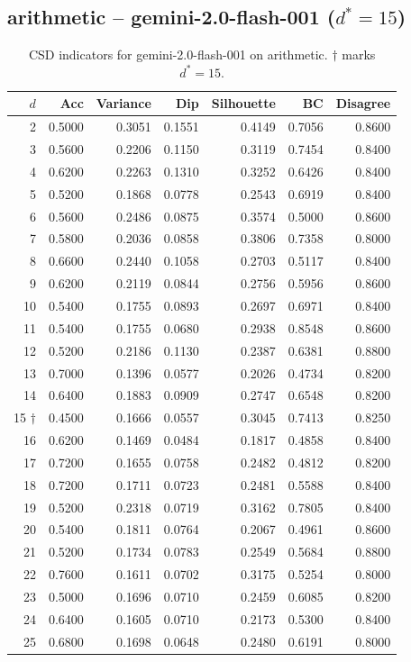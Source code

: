 \documentclass[11pt]{article}
\begin{document}
\subsection{arithmetic -- gemini-2.0-flash-001 ($d^*=15$)}

\begin{table}[h]\centering\small
\begin{tabular}{r|r|r|r|r|r|r}
\toprule
$d$ & Acc & Variance & Dip & Silhouette & BC & Disagree \\
\midrule
2 & 0.5000 & 0.3051 & 0.1551 & 0.4149 & 0.7056 & 0.8600 \\
3 & 0.5600 & 0.2206 & 0.1150 & 0.3119 & 0.7454 & 0.8400 \\
4 & 0.6200 & 0.2263 & 0.1310 & 0.3252 & 0.6426 & 0.8400 \\
5 & 0.5200 & 0.1868 & 0.0778 & 0.2543 & 0.6919 & 0.8400 \\
6 & 0.5600 & 0.2486 & 0.0875 & 0.3574 & 0.5000 & 0.8600 \\
7 & 0.5800 & 0.2036 & 0.0858 & 0.3806 & 0.7358 & 0.8000 \\
8 & 0.6600 & 0.2440 & 0.1058 & 0.2703 & 0.5117 & 0.8400 \\
9 & 0.6200 & 0.2119 & 0.0844 & 0.2756 & 0.5956 & 0.8600 \\
10 & 0.5400 & 0.1755 & 0.0893 & 0.2697 & 0.6971 & 0.8400 \\
11 & 0.5400 & 0.1755 & 0.0680 & 0.2938 & 0.8548 & 0.8600 \\
12 & 0.5200 & 0.2186 & 0.1130 & 0.2387 & 0.6381 & 0.8800 \\
13 & 0.7000 & 0.1396 & 0.0577 & 0.2026 & 0.4734 & 0.8200 \\
14 & 0.6400 & 0.1883 & 0.0909 & 0.2747 & 0.6548 & 0.8200 \\
15 $\dagger$ & 0.4500 & 0.1666 & 0.0557 & 0.3045 & 0.7413 & 0.8250 \\
16 & 0.6200 & 0.1469 & 0.0484 & 0.1817 & 0.4858 & 0.8400 \\
17 & 0.7200 & 0.1655 & 0.0758 & 0.2482 & 0.4812 & 0.8200 \\
18 & 0.7200 & 0.1711 & 0.0723 & 0.2481 & 0.5588 & 0.8400 \\
19 & 0.5200 & 0.2318 & 0.0719 & 0.3162 & 0.7805 & 0.8400 \\
20 & 0.5400 & 0.1811 & 0.0764 & 0.2067 & 0.4961 & 0.8600 \\
21 & 0.5200 & 0.1734 & 0.0783 & 0.2549 & 0.5684 & 0.8800 \\
22 & 0.7600 & 0.1611 & 0.0702 & 0.3175 & 0.5254 & 0.8000 \\
23 & 0.5000 & 0.1696 & 0.0710 & 0.2459 & 0.6085 & 0.8200 \\
24 & 0.6400 & 0.1605 & 0.0710 & 0.2173 & 0.5300 & 0.8400 \\
25 & 0.6800 & 0.1698 & 0.0648 & 0.2480 & 0.6191 & 0.8000 \\
\bottomrule
\end{tabular}
\caption{CSD indicators for gemini-2.0-flash-001 on arithmetic. $\dagger$ marks $d^*=15$.}
\end{table}
\end{document}
